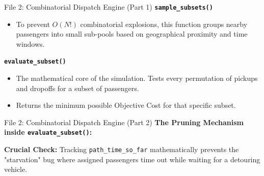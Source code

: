 \documentclass{beamer}
\begin{document}
\begin{frame}{File 2: Combinatorial Dispatch Engine (Part 1)}
  \textbf{\texttt{sample\_subsets()}}
  \begin{itemize}
      \item To prevent $O(N!)$ combinatorial explosions, this function groups nearby passengers into small sub-pools based on geographical proximity and time windows.
  \end{itemize}
  \vspace{0.3cm}
  \textbf{\texttt{evaluate\_subset()}}
  \begin{itemize}
      \item The mathematical core of the simulation. Tests every permutation of pickups and dropoffs for a subset of passengers.
      \item Returns the minimum possible Objective Cost for that specific subset.
  \end{itemize}
\end{frame}

\begin{frame}{File 2: Combinatorial Dispatch Engine (Part 2)}
  \textbf{The Pruning Mechanism inside \texttt{evaluate\_subset()}:}
  \begin{center}
  \end{center}
  \vspace{0.2cm}
  \footnotesize
  \textbf{Crucial Check:} Tracking \texttt{path\_time\_so\_far} mathematically prevents the "starvation" bug where assigned passengers time out while waiting for a detouring vehicle.
\end{frame}
\end{document}
